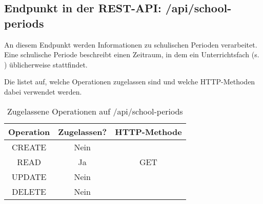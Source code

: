 \subsection{Endpunkt in der REST-API: /api/school-periods}
\label{sec:end:rest:api:schools-periods}
An diesem Endpunkt werden Informationen zu schulischen Perioden verarbeitet. Eine schulische Periode beschreibt einen Zeitraum, in dem ein Unterrichtsfach (s. ) üblicherweise stattfindet.

Die  listet auf, welche Operationen zugelassen sind und welche HTTP-Methoden dabei verwendet werden. 


\begin{table}[!htbp]
	\begin{tabular}{|c|c|c|}
		\hline
			\textbf{Operation} & \textbf{Zugelassen?} & \textbf{HTTP-Methode} \\ \hline
			CREATE & Nein & \\ \hline 
			READ & Ja & GET \\ \hline
			UPDATE & Nein & \\ \hline 
			DELETE & Nein & \\ \hline
	\end{tabular}

		\caption{Zugelassene Operationen auf /api/school-periods}
		\label{tab:end:rest:api:schools_years:meth}
\end{table}